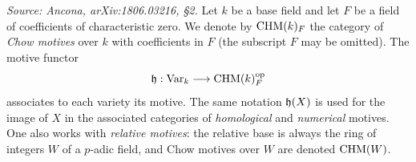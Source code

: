 \begin{definition}
  \label{def:chow-motives}
  \textit{Source: Ancona, arXiv:1806.03216, §2.}
  Let \(k\) be a base field and let \(F\) be a field of coefficients of
  characteristic zero. We denote by \(\mathrm{CHM}(k)_{F}\) the category of \emph{Chow
  motives} over \(k\) with coefficients in \(F\) (the subscript \(F\) may be
  omitted). The motive functor
  \[\mathfrak{h} : \mathrm{Var}_k \longrightarrow \mathrm{CHM}(k)_{F}^{\mathrm{op}}\]
  associates to each variety its motive. The same notation \(\mathfrak{h}(X)\) is used for
  the image of \(X\) in the associated categories of \emph{homological} and
  \emph{numerical} motives. One also works with \emph{relative motives}: the
  relative base is always the ring of integers \(W\) of a \(p\)-adic field, and
  Chow motives over \(W\) are denoted \(\mathrm{CHM}(W)\).
\end{definition}

